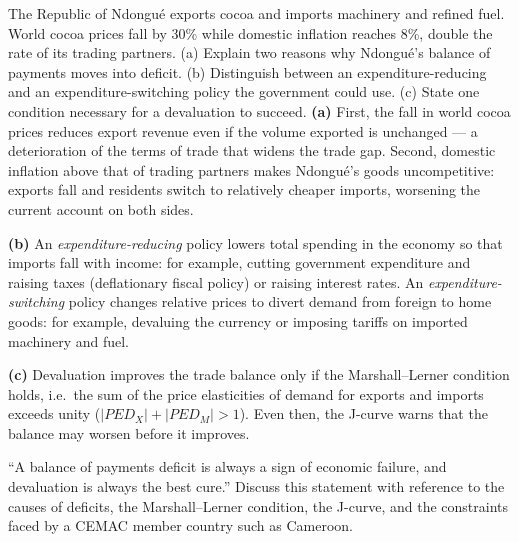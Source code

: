 \documentclass[11pt]{article}
\newcounter{popsec}
\newcounter{popsub}
\newcommand{\courssub}[1]{%
  \stepcounter{popsub}%
  \par\vspace{9pt}\noindent{\popxbold\fontsize{11.5}{13}\selectfont\color{popink}{\color{poporange}\thepopsec.\thepopsub}\hspace{6pt}#1}\par\nopagebreak\vspace{4pt}
}
\begin{document}
\courssub{Worked Exercise and Evaluation}

\begin{exoresolu}
The Republic of Ndongué exports cocoa and imports machinery and refined fuel. World cocoa prices fall by 30\% while domestic inflation reaches 8\%, double the rate of its trading partners. (a) Explain two reasons why Ndongué's balance of payments moves into deficit. (b) Distinguish between an expenditure-reducing and an expenditure-switching policy the government could use. (c) State one condition necessary for a devaluation to succeed.
\tcblower
\textbf{(a)} First, the fall in world cocoa prices reduces export revenue even if the volume exported is unchanged --- a deterioration of the terms of trade that widens the trade gap. Second, domestic inflation above that of trading partners makes Ndongué's goods uncompetitive: exports fall and residents switch to relatively cheaper imports, worsening the current account on both sides.

\textbf{(b)} An \emph{expenditure-reducing} policy lowers total spending in the economy so that imports fall with income: for example, cutting government expenditure and raising taxes (deflationary fiscal policy) or raising interest rates. An \emph{expenditure-switching} policy changes relative prices to divert demand from foreign to home goods: for example, devaluing the currency or imposing tariffs on imported machinery and fuel.

\textbf{(c)} Devaluation improves the trade balance only if the Marshall--Lerner condition holds, i.e.\ the sum of the price elasticities of demand for exports and imports exceeds unity ($|PED_X| + |PED_M| > 1$). Even then, the J-curve warns that the balance may worsen before it improves.
\end{exoresolu}

\begin{exercice}
``A balance of payments deficit is always a sign of economic failure, and devaluation is always the best cure.'' Discuss this statement with reference to the causes of deficits, the Marshall--Lerner condition, the J-curve, and the constraints faced by a CEMAC member country such as Cameroon.
\end{exercice}
\end{document}
